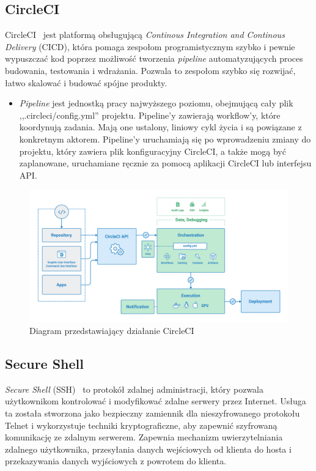 	\subsection{CircleCI}
	CircleCI~\cite{circleci} jest platformą obsługującą \textit{Continous Integration and Continous Delivery} (CICD), która pomaga zespołom programistycznym szybko i pewnie wypuszczać kod poprzez możliwość tworzenia \textit{pipeline} automatyzujących proces budowania, testowania i wdrażania. Pozwala to zespołom szybko się rozwijać, łatwo skalować i budować spójne produkty.
	\begin{itemize}
	\item \textit{Pipeline} jest jednostką pracy najwyższego poziomu, obejmującą cały plik ,,.circleci/config.yml'' projektu. Pipeline'y zawierają workflow'y, które koordynują zadania. Mają one ustalony, liniowy cykl życia i są powiązane z konkretnym aktorem. Pipeline'y uruchamiają się po wprowadzeniu zmiany do projektu, który zawiera plik konfiguracyjny CircleCI, a także mogą być zaplanowane, uruchamiane ręcznie za pomocą aplikacji CircleCI lub interfejsu API.
	\end{itemize}
\begin{figure}[H]
\centering\includegraphics[width=\textwidth]{figures/circleci_schema}
\caption{Diagram przedstawiający działanie CircleCI~\cite{circleci_schema}}\label{rys:CircleCI diagram}
\end{figure}

	\subsection{Secure Shell}
	\textit{Secure Shell} (SSH)~\cite{ssh} to protokół zdalnej administracji, który pozwala użytkownikom kontrolować i modyfikować zdalne serwery przez Internet. Usługa ta została stworzona jako bezpieczny zamiennik dla nieszyfrowanego protokołu Telnet i wykorzystuje techniki kryptograficzne, aby zapewnić szyfrowaną komunikację ze zdalnym serwerem. Zapewnia mechanizm uwierzytelniania zdalnego użytkownika, przesyłania danych wejściowych od klienta do hosta i przekazywania danych wyjściowych z powrotem do klienta.
	
